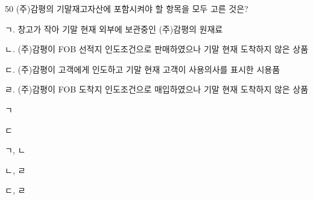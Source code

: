 \begin{question}{50}
(주)감평의 기말재고자산에 포함시켜야 할 항목을 모두 고른 것은?
\begin{framedtext}
ㄱ. 창고가 작아 기말 현재 외부에 보관중인 (주)감평의 원재료 \par
ㄴ. (주)감평이 FOB 선적지 인도조건으로 판매하였으나 기말 현재 도착하지 않은 상품 \par
ㄷ. (주)감평이 고객에게 인도하고 기말 현재 고객이 사용의사를 표시한 시용품 \par
ㄹ. (주)감평이 FOB 도착지 인도조건으로 매입하였으나 기말 현재 도착하지 않은 상품 \par
\end{framedtext}
\begin{choices}
  \item ㄱ
  \item ㄷ
  \item ㄱ, ㄴ
  \item ㄴ, ㄹ
  \item ㄷ, ㄹ
\end{choices}
\end{question}
